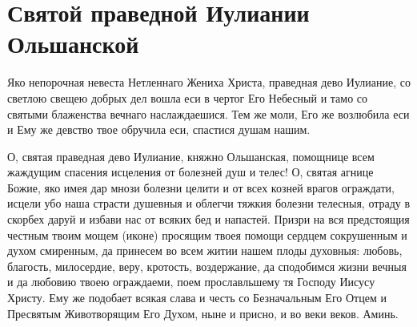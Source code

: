 
\section{Святой праведной Иулиании Ольшанской}\begin{mymulticols}


Яко непорочная невеста Нетленнаго Жениха Христа, праведная дево Иулиание,  со светлою свещею добрых дел вошла еси в чертог Его Небесный и тамо со святыми блаженства вечнаго наслаждаешися. Тем же моли, Его же возлюбила еси и Ему же девство твое обручила еси, спастися душам нашим.


О, святая праведная дево Иулиание, княжно Ольшанская, помощнице всем жаждущим спасения исцеления от болезней душ и телес! О, святая агнице Божие, яко имея дар мнози болезни целити и от всех козней врагов ограждати, исцели убо наша страсти душевныя и облегчи тяжкия болезни телесныя, отраду в скорбех даруй и избави нас от всяких бед и напастей. Призри на вся предстоящия честным твоим мощем (иконе) просящим твоея помощи сердцем сокрушенным и духом смиренным, да принесем во всем житии нашем плоды духовныя: любовь, благость, милосердие, веру, кротость, воздержание, да сподобимся жизни вечныя и да любовию твоею ограждаеми, поем прославльшему тя Господу Иисусу Христу. Ему же подобает всякая слава и честь со Безначальным Его Отцем и Пресвятым Животворящим Его Духом, ныне и присно, и во веки веков. Аминь.

\end{mymulticols}

\mychapterending


